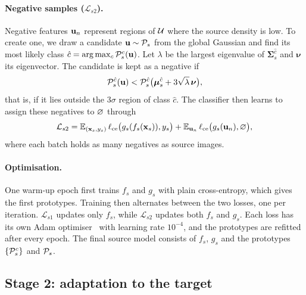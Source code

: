 \paragraph{Negative samples ($\mathcal{L}_{s2}$).}
Negative features $\mathbf{u}_n$ represent regions of $\mathcal{U}$ where the source density is low.
To create one, we draw a candidate $\mathbf{u}\sim\mathcal{P}_s$ from the global Gaussian and find its most likely class $\hat c=\arg\max_c \mathcal{P}_s^c(\mathbf{u})$.
Let $\lambda$ be the largest eigenvalue of $\bm{\Sigma}_s^{\hat c}$ and $\bm{\nu}$ its eigenvector.
The candidate is kept as a negative if
\begin{equation}
  \mathcal{P}_s^{\hat c}(\mathbf{u}) < \mathcal{P}_s^{\hat c}\big(\bm{\mu}_s^{\hat c}+3\sqrt{\lambda}\,\bm{\nu}\big),
  \label{eq:neg}
\end{equation}
that is, if it lies outside the $3\sigma$ region of class $\hat c$.
The classifier then learns to assign these negatives to $\varnothing$ through
\begin{equation}
  \mathcal{L}_{s2} = \mathbb{E}_{(\mathbf{x}_s,y_s)}\,\ell_{\mathrm{ce}}\big(g_s(f_s(\mathbf{x}_s)),y_s\big) + \mathbb{E}_{\mathbf{u}_n}\,\ell_{\mathrm{ce}}\big(g_s(\mathbf{u}_n),\varnothing\big),
  \label{eq:ls2}
\end{equation}
where each batch holds as many negatives as source images.

\paragraph{Optimisation.}
One warm-up epoch first trains $f_s$ and $g_s$ with plain cross-entropy, which gives the first prototypes.
Training then alternates between the two losses, one per iteration.
$\mathcal{L}_{s1}$ updates only $f_s$, while $\mathcal{L}_{s2}$ updates both $f_s$ and $g_s$.
Each loss has its own Adam optimiser~\citep{kingma2015adam} with learning rate $10^{-4}$, and the prototypes are refitted after every epoch.
The final source model consists of $f_s$, $g_s$ and the prototypes $\{\mathcal{P}_s^c\}$ and $\mathcal{P}_s$.

\subsection{Stage 2: adaptation to the target}\label{sec:stage2}

